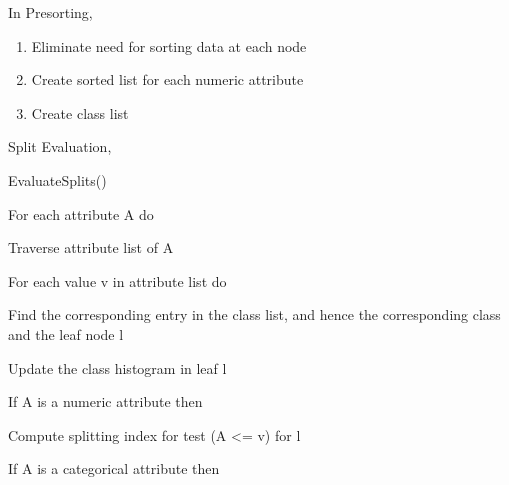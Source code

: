 \documentclass[12pt]{article}
\renewcommand{\_}{\kern-1.5pt\textunderscore\kern-1.5pt}
\begin{document}
\begin{enumerate}
In Presorting, \par

\begin{enumerate}
	\item Eliminate need for sorting data at each node\par

	\item Create sorted list for each numeric attribute\par

	\item Create class list
\end{enumerate}\par

Split Evaluation, \par

EvaluateSplits()\par

For each attribute A do\par

\tab Traverse attribute list of A\par

\tab For each value v in attribute list do\par

\begin{adjustwidth}{1.0in}{0.0in}
Find the corresponding entry in the class list, and hence the corresponding class and the leaf node l\par

\end{adjustwidth}

\begin{adjustwidth}{1.0in}{0.0in}
Update the class histogram in leaf l\par

\end{adjustwidth}

\begin{adjustwidth}{1.0in}{0.0in}
If A is a numeric attribute then\par

\end{adjustwidth}

\begin{adjustwidth}{1.0in}{0.0in}
\tab Compute splitting index for test (A <= v) for l\par

\end{adjustwidth}

\tab If A is a categorical attribute then\par


\end{enumerate}
\end{document}
